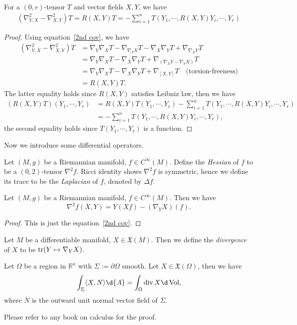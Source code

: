 \begin{prop}\label{Ricci identity}
    For a $(0,r)$-tensor $T$ and vector fields $X,Y$, we have
    \begin{align*}
        (\nabla^2_{Y,X}-\nabla^2_{X,Y})T=R(X,Y)T=-\sum_{i=1}^nT(Y_1,\cdots,R(X,Y)Y_i,\cdots,Y_r)
    \end{align*}
\end{prop}
\begin{proof}
    Using equation~\ref{2nd cov}, we have
    \begin{align*}
        (\nabla^2_{Y,X}-\nabla^2_{X,Y})T&=\nabla_Y\nabla_XT-\nabla_{\nabla_YX}T-\nabla_X\nabla_YT+\nabla_{\nabla_XY}T\\
        &=\nabla_Y\nabla_XT-\nabla_X\nabla_YT+\nabla_{(\nabla_XY-\nabla_YX)}T\\
        &=\nabla_Y\nabla_XT-\nabla_X\nabla_YT+\nabla_{[X,Y]}T\quad\text{(torsion-freeness)}\\
        &=R(X,Y)T.
    \end{align*}
    The latter equality holds since $R(X,Y)$ satisfies Leibniz law, then we have
    \begin{align*}
        (R(X,Y)T)(Y_1,\cdots,Y_r)&=R(X,Y)T(Y_1,\cdots,Y_r)-\sum_{i=1}^nT(Y_1,\cdots,R(X,Y)Y_i,\cdots,Y_r)\\
        &=-\sum_{i=1}^nT(Y_1,\cdots,R(X,Y)Y_i,\cdots,Y_r),
    \end{align*}
    the second equality holds since $T(Y_1,\cdots,Y_r)$ is a function.
\end{proof}

Now we introduce some differential operators.

\begin{defn}
    Let $(M,g)$ be a Riemannian manifold, $f\in C^\infty(M)$.
    Define the \emph{Hessian} of $f$ to be a $(0,2)$-tensor $\nabla^2f$.
    Ricci identity shows $\nabla^2f$ is symmetric, hence we define its trace to be the \emph{Laplacian} of $f$, denoted by $\Delta f$.
\end{defn}

\begin{prop}
    Let $(M,g)$ be a Riemannian manifold, $f\in C^\infty(M)$.
    Then we have
    \[\nabla^2f(X,Y)=Y(Xf)-(\nabla_YX)(f).\]
\end{prop}
\begin{proof}
    This is just the equation~\ref{2nd cov}.
\end{proof}

\begin{defn}
    Let $M$ be a differentiable manifold, $X\in\mathfrak{X}(M)$.
    Then we define the \emph{divergence} of $X$ to be $\operatorname{tr}(Y\mapsto\nabla_YX)$.
\end{defn}

\begin{thm}
    Let $\Omega$ be a region in $\mathbb{R}^n$ with $\Sigma:=\partial\Omega$ smooth.
    Let $X\in\mathfrak{X}(\Omega)$, then we have
    \[\int_\Sigma\langle X,N\rangle\d{A}=\int_\Omega\div{X}\d\Vol,\]
    where $N$ is the outward unit normal vector field of $\Sigma$.
\end{thm}
Please refer to any book on calculus for the proof.